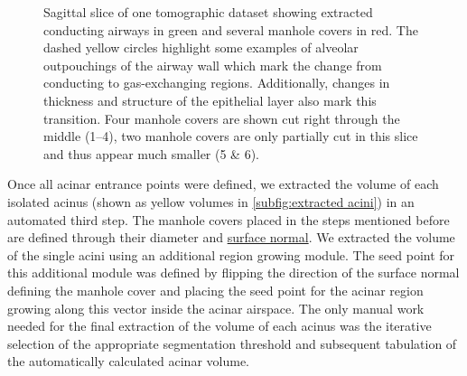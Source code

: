 \documentclass[a4paper,DIVcalc,abstract,english]{scrartcl}
\newlength\imagescale		%
\begin{document}
\begin{figure}[p]
%
	\caption{Sagittal slice of one tomographic dataset showing extracted conducting airways in green and several manhole covers in red.
		The dashed yellow circles highlight some examples of alveolar outpouchings of the airway wall which mark the change from conducting to gas-exchanging regions.
		Additionally, changes in thickness and structure of the epithelial layer also mark this transition.
		Four manhole covers are shown cut right through the middle (\numrange{1}{4}), two manhole covers are only partially cut in this slice and thus appear much smaller (5 \& 6).}
	\label{fig:ManholeCoverExplanation}
\end{figure}

Once all acinar entrance points were defined, we extracted the volume of each isolated acinus (shown as yellow volumes in \autoref{subfig:extracted acini}) in an automated third step.
The manhole covers placed in the steps mentioned before are defined through their diameter and \href{https://secure.wikimedia.org/wikipedia/en/w/index.php?title=Surface_normal&oldid=411684319}{surface normal}.
We extracted the volume of the single acini using an additional region growing module.
The seed point for this additional module was defined by flipping the direction of the surface normal defining the manhole cover and placing the seed point for the acinar region growing along this vector inside the acinar airspace.
The only manual work needed for the final extraction of the volume of each acinus was the iterative selection of the appropriate segmentation threshold and subsequent tabulation of the automatically calculated acinar volume.
\end{document}
